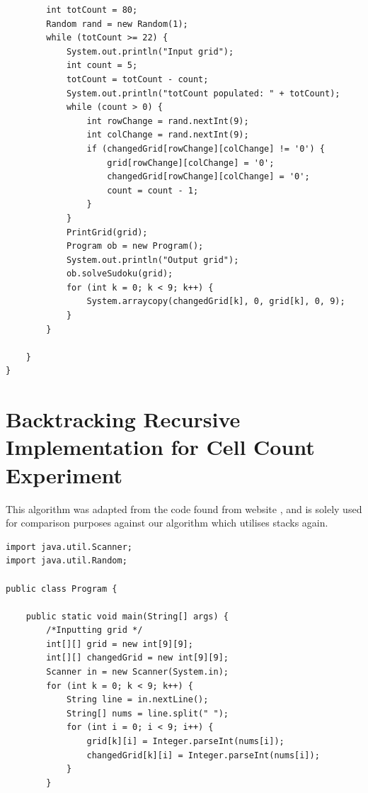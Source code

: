 \documentclass[11pt]{article}
\begin{document}
\begin{appendices}
\begin{lstlisting}
        int totCount = 80;
        Random rand = new Random(1);
        while (totCount >= 22) {
            System.out.println("Input grid");
            int count = 5;
            totCount = totCount - count;
            System.out.println("totCount populated: " + totCount);
            while (count > 0) {
                int rowChange = rand.nextInt(9);
                int colChange = rand.nextInt(9);
                if (changedGrid[rowChange][colChange] != '0') {
                    grid[rowChange][colChange] = '0';
                    changedGrid[rowChange][colChange] = '0';
                    count = count - 1;
                }
            }
            PrintGrid(grid);
            Program ob = new Program();
            System.out.println("Output grid");
            ob.solveSudoku(grid);
            for (int k = 0; k < 9; k++) {
                System.arraycopy(changedGrid[k], 0, grid[k], 0, 9);
            }
        }

    }
}

\end{lstlisting}

\newpage
\section{Backtracking Recursive Implementation for Cell Count Experiment}
This algorithm was adapted from the code found from website \cite{art6}, 
and is solely used for comparison purposes against our 
algorithm which utilises stacks again.

\vspace{3mm}
\begin{lstlisting}
import java.util.Scanner;
import java.util.Random;

public class Program {

    public static void main(String[] args) {
        /*Inputting grid */
        int[][] grid = new int[9][9];
        int[][] changedGrid = new int[9][9];
        Scanner in = new Scanner(System.in);
        for (int k = 0; k < 9; k++) {
            String line = in.nextLine();
            String[] nums = line.split(" ");
            for (int i = 0; i < 9; i++) {
                grid[k][i] = Integer.parseInt(nums[i]);
                changedGrid[k][i] = Integer.parseInt(nums[i]);
            }
        }


\end{lstlisting}
\end{appendices}
\end{document}
